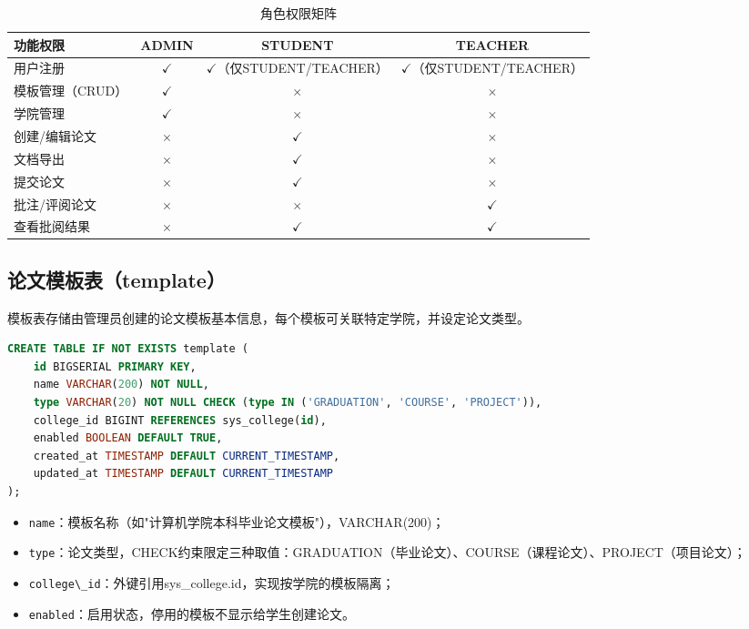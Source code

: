 \documentclass{../softeng}
\begin{document}
\begin{table}[htbp]
    \centering
    \caption{角色权限矩阵}
    \label{tab:role_auth}
    \begin{tabular}{|l|c|c|c|}
        \hline
        \textbf{功能权限} & \textbf{ADMIN} & \textbf{STUDENT} & \textbf{TEACHER} \\
        \hline
        用户注册 & $\checkmark$ & $\checkmark$（仅STUDENT/TEACHER） & $\checkmark$（仅STUDENT/TEACHER） \\
        \hline
        模板管理（CRUD） & $\checkmark$ & $\times$ & $\times$ \\
        \hline
        学院管理 & $\checkmark$ & $\times$ & $\times$ \\
        \hline
        创建/编辑论文 & $\times$ & $\checkmark$ & $\times$ \\
        \hline
        文档导出 & $\times$ & $\checkmark$ & $\times$ \\
        \hline
        提交论文 & $\times$ & $\checkmark$ & $\times$ \\
        \hline
        批注/评阅论文 & $\times$ & $\times$ & $\checkmark$ \\
        \hline
        查看批阅结果 & $\times$ & $\checkmark$ & $\checkmark$ \\
        \hline
    \end{tabular}
\end{table}

\subsection{论文模板表（template）}

模板表存储由管理员创建的论文模板基本信息，每个模板可关联特定学院，并设定论文类型。

\begin{lstlisting}[language=SQL,caption={template 建表语句}]
CREATE TABLE IF NOT EXISTS template (
    id BIGSERIAL PRIMARY KEY,
    name VARCHAR(200) NOT NULL,
    type VARCHAR(20) NOT NULL CHECK (type IN ('GRADUATION', 'COURSE', 'PROJECT')),
    college_id BIGINT REFERENCES sys_college(id),
    enabled BOOLEAN DEFAULT TRUE,
    created_at TIMESTAMP DEFAULT CURRENT_TIMESTAMP,
    updated_at TIMESTAMP DEFAULT CURRENT_TIMESTAMP
);
\end{lstlisting}

\begin{itemize}
    \item \verb|name|：模板名称（如"计算机学院本科毕业论文模板"），VARCHAR(200)；
    \item \verb|type|：论文类型，CHECK约束限定三种取值：GRADUATION（毕业论文）、COURSE（课程论文）、PROJECT（项目论文）；
    \item \verb|college\_id|：外键引用sys\_college.id，实现按学院的模板隔离；
    \item \verb|enabled|：启用状态，停用的模板不显示给学生创建论文。
\end{itemize}
\end{document}
